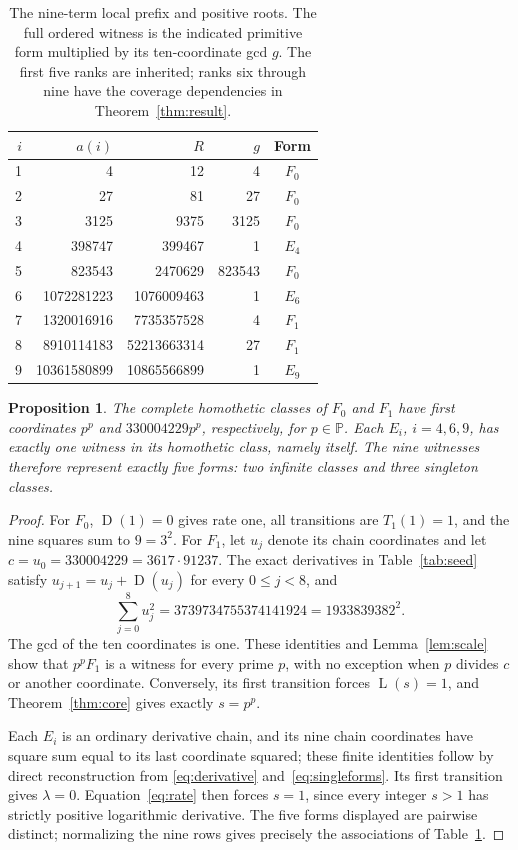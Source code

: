 \documentclass[11pt]{article}
\newcommand{\D}{\operatorname{D}}
\newcommand{\Lrate}{\operatorname{L}}
\newcommand{\PP}{\mathbb{P}}
\newtheorem{proposition}[theorem]{Proposition}
\theoremstyle{definition}
\theoremstyle{remark}
\begin{document}
\begin{table}[htbp]
\centering\small
\begin{tabular}{rrrrc}
\toprule
$i$ & $a(i)$ & $R$ & $g$ & Form\\
\midrule
1&4&12&4&$F_0$\\
2&27&81&27&$F_0$\\
3&3125&9375&3125&$F_0$\\
4&398747&399467&1&$E_4$\\
5&823543&2470629&823543&$F_0$\\
6&1072281223&1076009463&1&$E_6$\\
7&1320016916&7735357528&4&$F_1$\\
8&8910114183&52213663314&27&$F_1$\\
9&10361580899&10865566899&1&$E_9$\\
\bottomrule
\end{tabular}
\caption{The nine-term local prefix and positive roots. The full ordered
witness is the indicated primitive form multiplied by its ten-coordinate
gcd $g$. The first five ranks are inherited; ranks six through nine have
the coverage dependencies in Theorem~\ref{thm:result}.}
\label{tab:terms}
\end{table}

\begin{proposition}\label{prop:classes}
The complete homothetic classes of $F_0$ and $F_1$ have first
coordinates $p^p$ and $330004229p^p$, respectively, for $p\in\PP$.
Each $E_i$, $i=4,6,9$, has exactly one witness in its homothetic
class, namely itself. The nine witnesses therefore represent exactly
five forms: two infinite classes and three singleton classes.
\end{proposition}
\begin{proof}
For $F_0$, $\D(1)=0$ gives rate one, all transitions are
$T_1(1)=1$, and the nine squares sum to $9=3^2$.
For $F_1$, let $u_j$ denote its chain coordinates and let
$c=u_0=330004229=3617\cdot91237$.
The exact derivatives in Table~\ref{tab:seed} satisfy
$u_{j+1}=u_j+\D(u_j)$ for every $0\le j<8$, and
\begin{equation}\label{eq:seedsquare}
 \sum_{j=0}^8u_j^2=3739734755374141924=1933839382^2.
\end{equation}
The gcd of the ten coordinates is one. These identities and
Lemma~\ref{lem:scale} show that $p^pF_1$ is a witness for every
prime $p$, with no exception when $p$ divides $c$ or another
coordinate. Conversely, its first transition forces $\Lrate(s)=1$,
and Theorem~\ref{thm:core} gives exactly $s=p^p$.

Each $E_i$ is an ordinary derivative chain, and its nine chain
coordinates have square sum equal to its last coordinate squared;
these finite identities follow by direct reconstruction from
\eqref{eq:derivative} and~\eqref{eq:singleforms}. Its first transition gives $\lambda=0$.
Equation~\eqref{eq:rate} then forces $s=1$, since every integer
$s>1$ has strictly positive logarithmic derivative.
The five forms displayed are pairwise distinct; normalizing the nine
rows gives precisely the associations of Table~\ref{tab:terms}.
\end{proof}
\end{document}
